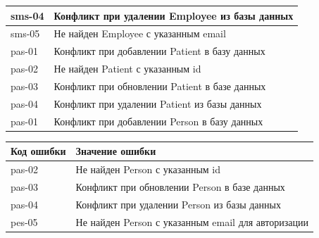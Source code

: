 \documentclass[a4paper,article]{article}
\begin{document}
\begin{sloppypar}
\begin{appendices}
\begin{xltabular}{\textwidth} { |
                >{\hsize} X |
                >{\hsize} X | }
            \hline
            sms-04
            & Конфликт при удалении Employee из базы данных \\
            
            \hline
            sms-05
            & Не найден Employee с указанным email \\
            
            \hline
            pas-01
            & Конфликт при добавлении Patient в базу данных \\
            
            \hline
            pas-02
            & Не найден Patient с указанным id \\
            
            \hline
            pas-03
            & Конфликт при обновлении Patient в базе данных \\
            
            \hline
            pas-04
            & Конфликт при удалении Patient из базы данных \\
            
            \hline
            pas-01
            & Конфликт при добавлении Person в базу данных \\
            
            \hline
        \end{xltabular}
            
        \begin{xltabular}{\textwidth} { |
                >{\hsize} X |
                >{\hsize} X | }
                
            \hline
            Код ошибки
            & Значение ошибки \\
                
            \hline
            pas-02
            & Не найден Person с указанным id \\
            
            \hline
            pas-03
            & Конфликт при обновлении Person в базе данных \\
            
            \hline
            pas-04
            & Конфликт при удалении Person из базы данных \\
            
            \hline
            pes-05
            & Не найден Person с указанным email для авторизации \\
            

\end{xltabular}
\end{appendices}
\end{sloppypar}
\end{document}
